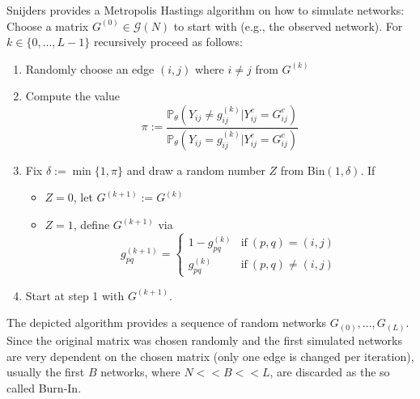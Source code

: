 \documentclass[10pt, conference, compsocconf]{IEEEtran}
\begin{document}
Snijders \cite{Snijders.2002} provides a Metropolis Hastings algorithm on how to simulate networks:
Choose a matrix $G^{(0)} \in \mathcal{G}(N)$ to start with (e.g., the observed network). For $k \in \{0,...,L-1\}$ recursively proceed as follows:\\
\begin{enumerate}
\item Randomly choose an edge $(i,j)$ where $i \neq j$ from $G^{(k)}$
\item Compute the value
$$\pi := \dfrac{\mathbb{P}_{\theta}(Y_{ij} \neq g_{ij}^{(k)} | Y_{ij}^c=G_{ij}^c)}{\mathbb{P}_{\theta}(Y_{ij}= g_{ij}^{(k)} | Y_{ij}^c=G_{ij}^c)}$$
\item Fix $\delta:= \min\{1, \pi\}$ and draw a random number $Z$ from Bin$(1, \delta)$. If
\begin{itemize}
\item $Z=0$, let $G^{(k+1)} := G^{(k)}$ 
\item $Z=1$, define $G^{(k+1)}$ via
$$g_{pq}^{(k+1)}=\begin{cases}
1-g_{pq}^{(k)}& \text{if}~ (p,q)=(i,j) \\
g_{pq}^{(k)} &\text{if}~ (p,q) \neq (i,j) 
\end{cases}$$
\end{itemize}
\item Start at step 1 with $G^{(k+1)}$.
\end{enumerate}
\vspace{0.3cm}
\noindent The depicted algorithm provides a sequence of random networks $G_(0),\dots,G_(L)$. Since the original matrix was chosen randomly and the first simulated networks are very dependent on the chosen matrix (only one edge is changed per iteration), usually
the first $B$ networks, where $N << B << L$, are discarded as the so called Burn-In.
\end{document}
